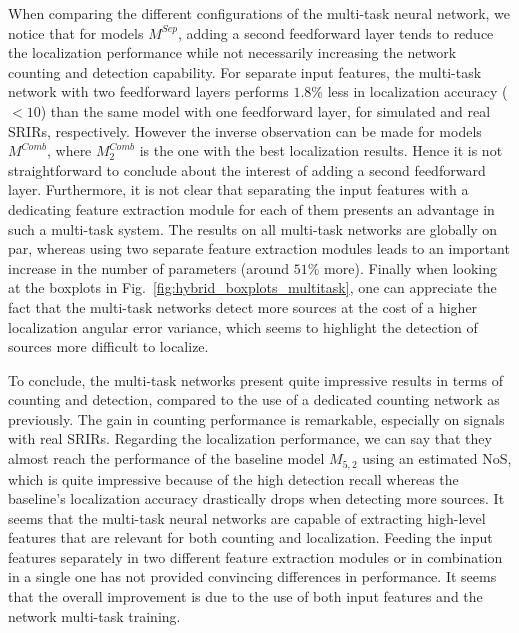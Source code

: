 When comparing the different configurations of the multi-task neural network, we notice that for models $M^{Sep}$, adding a second feedforward layer tends to reduce the localization performance while not necessarily increasing the network counting and detection capability. For separate input features, the multi-task network with two feedforward layers performs $1.8$\% less in localization accuracy ($<10$\textdegree) than the same model with one feedforward layer, for simulated and real SRIRs, respectively. However the inverse observation can be made for models $M^{Comb}$, where $M^{Comb}_2$ is the one with the best localization results. Hence it is not straightforward to conclude about the interest of adding a second feedforward layer. Furthermore, it is not clear that separating the input features with a dedicating feature extraction module for each of them presents an advantage in such a multi-task system. The results on all multi-task networks are globally on par, whereas using two separate feature extraction modules leads to an important increase in the number of parameters (around $51$\% more). Finally when looking at the boxplots in Fig.~\ref{fig:hybrid_boxplots_multitask}, one can appreciate the fact that the multi-task networks detect more sources at the cost of a higher localization angular error variance, which seems to highlight the detection of sources more difficult to localize.

To conclude, the multi-task networks present quite impressive results in terms of counting and detection, compared to the use of a dedicated counting network as previously. The gain in counting performance is remarkable, especially on signals with real SRIRs. Regarding the localization performance, we can say that they almost reach the performance of the baseline model $M_{5,2}$ using an estimated NoS, which is quite impressive because of the high detection recall whereas the baseline's localization accuracy drastically drops when detecting more sources. It seems that the multi-task neural networks are capable of extracting high-level features that are relevant for both counting and localization. Feeding the input features separately in two different feature extraction modules or in combination in a single one has not provided convincing differences in performance. It seems that the overall improvement is due to the use of both input features and the network multi-task training. 

